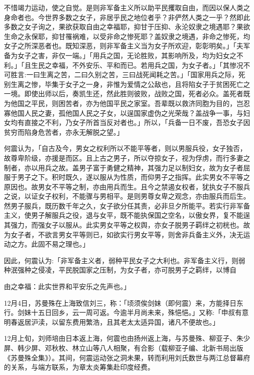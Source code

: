 \noindent 不惜竭力运动，使之自觉。是则非军备主义所以助平民攫取自由，而因以保人类之身命者也。今世界多数之女子，非居乎民之地位者乎？非俨然人类之一乎？然即此多数之女子询之，果欲获取自由之幸福耶，抑甘于压抑、永沦奴隶之境遇耶？果欲生命之永保耶，抑甘罹祸难，以受非命之惨死耶？盖奴隶之境遇，非命之惨死，均女子之所深恶者也。既知深恶，则非军备主义当为女子所欢迎，彰彰明矣。」「夫军备为女子之害，非仅一端。」「用兵之国，无论胜败，其影响所及，均为妇女之不利。」「且生民之幸福，不外安乐、平和而已。若用兵之国，为女子者。」「其惨况不可胜言:一曰生离之苦，二曰久别之苦，三曰战死闻耗之苦。」「国家用兵之际，死别生离之惨，毕集于女子之一身，非惟为爱情之公敌也，且将陷女子于贫困死亡之一境。即使出师以后，奏凯生还，然此胜则彼败，战败之国，死者必众。盖死者既为他国之平民，则困苦者，亦为他国平民之家室。吾辈既以救济同胞为目的，岂忍寡他国人民之妻，孤他国人民之子女，以逞国家虚伪之光荣哉？盖战争一事，与妇女均有直接之不利，乃女子所首当反对者也。」所以，「兵备一日不废，吾恐女子因贫穷而陷身危苦者，亦永无解脱之望。」

何震认为，「自古及今，男女之权利所以不能平等者，则以男服兵役，女子独否，故尊卑阶级，亦援是而区。且上古之男子，所以夺掠女子，视为俘虏，而行多妻之制者，亦以用兵之故。盖男子富于勇健之精神，其强力足以制妇女，故为女子者屈服于男子之下。积时既久，遂以服从为性质，而仰男子之指挥。此实男女不平等之原因也。故男女不平等之制，亦由用兵而生。且今之禁遏女权者，犹执女子不服兵之说，以证女子权利，不能骤与男相平。是则男尊女卑之观念，亦由服兵而后生。然男子服兵，既历数千年之久，女子欲分任其责，必非旦夕所能平。若实行非军备主义，使男子解服兵之役，退与女平，既不能执保国之空名，以傲女界，复不能逞其强力，而强女子以服从。此实男女平等之权舆，亦女子脱男子羁绊之初桄也。故为女子者，不欲言男女平等则已，如欲实行男女平等，则舍非兵备主义外，决无运动之方。此固不易之理也。」

因此，何震认为:「非军备主义者，弱种平民女子之大利也。非军备主义行，则弱种泯强种之侵凌，平民脱国家之压制，为女子者，亦可脱男子之羁绊，以博自


\noindent 由之幸福：此实世界和平安乐之先声也。」

12月4日，苏曼殊在上海致信刘三，称：「顷须俟剑妹（即何震）来，方能择日东行。剑妹十五日回乡，云一周可返。今逾半月尚未来，殊悒悒。」又称:「申叔有意明春返居沪渎，以留东费用繁浩，且其老太太适异国，诸凡不便故也。」

12月上旬，刘师培由日本返上海，何震也由扬州返上海，与苏曼殊、柳亚子、朱少屏、韩少屏、邓秋枚、林立山等八人相聚，有合影（载柳亚子编、北新书局出版《苏曼殊全集》）。其间，何震运动张之洞未果，转而利用刘氏数世与两江总督幕府的关系，与端方联系，为章太炎筹集赴印度经费。

